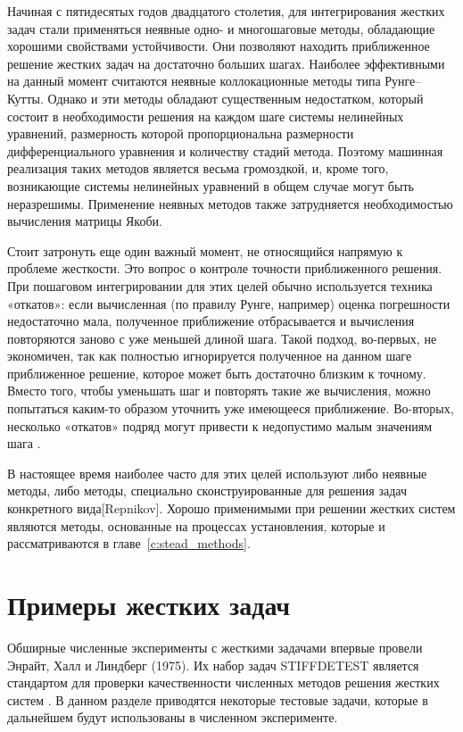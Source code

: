 \documentclass[a4paper,14pt]{extreport}
\begin{document}
 
 Начиная с пятидесятых годов двадцатого столетия, для интегрирования жестких задач стали применяться неявные одно- и многошаговые методы, обладающие хорошими свойствами устойчивости. Они позволяют находить приближенное решение жестких задач на достаточно больших шагах. Наиболее эффективными на данный момент считаются неявные коллокационные методы типа Рунге–Кутты. Однако и эти методы обладают существенным недостатком, который состоит в необходимости решения на каждом шаге системы нелинейных уравнений, размерность которой пропорциональна размерности дифференциального уравнения и количеству стадий метода. Поэтому машинная реализация таких методов является весьма громоздкой, и, кроме того, возникающие системы нелинейных уравнений в общем случае могут быть неразрешимы. Применение неявных методов также затрудняется необходимостью вычисления матрицы Якоби.
 
 
 Стоит затронуть еще один важный момент, не относящийся напрямую к проблеме жесткости. Это вопрос о контроле точности приближенного решения. При пошаговом интегрировании для этих целей обычно используется техника «откатов»: если вычисленная (по правилу Рунге, например) оценка погрешности недостаточно мала, полученное приближение отбрасывается и вычисления повторяются заново с уже меньшей длиной шага. Такой подход, во-первых, не экономичен, так как полностью игнорируется полученное на данном шаге приближенное решение, которое может быть достаточно близким к точному. Вместо того, чтобы уменьшать шаг и повторять такие же вычисления, можно попытаться каким-то образом уточнить уже имеющееся приближение. Во-вторых, несколько «откатов» подряд могут привести к недопустимо малым
значениям шага \cite{Faleichik_Vych_alg}.

В настоящее время наиболее часто для этих целей используют либо неявные методы, либо методы, специально сконструированные для решения задач конкретного вида[Repnikov]. Хорошо применимыми при решении жестких систем являются методы, основанные на процессах установления, которые и рассматриваются в главе~\ref{c:stead_methods}. 

  
  \section{Примеры жестких задач}
  \label{s:stiff_examples}  
  Обширные численные эксперименты с жесткими задачами впервые провели Энрайт, Халл и Линдберг (1975). Их набор задач STIFFDETEST является стандартом для проверки качественности численных методов решения жестких систем \cite{hairer}. В данном разделе приводятся некоторые тестовые задачи, которые в дальнейшем будут использованы в численном эксперименте.
  
\end{document}
